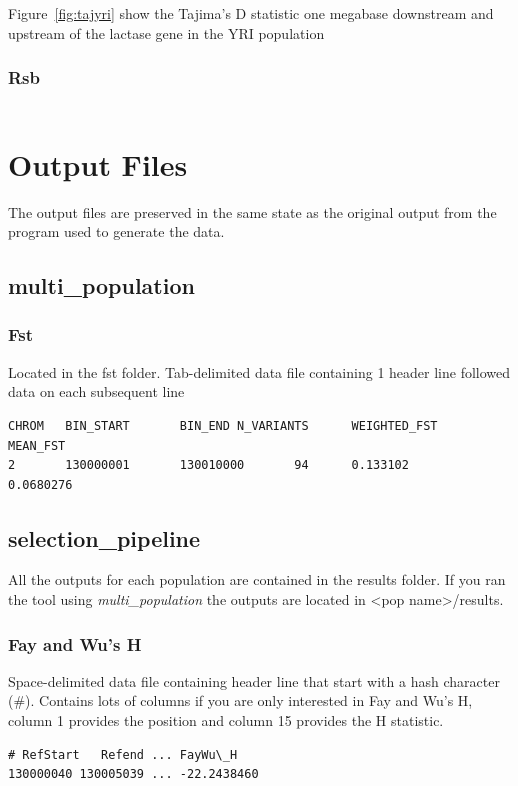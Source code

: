 Figure~\ref{fig:tajyri} show the Tajima's D statistic one megabase downstream and upstream of the lactase gene in the YRI population

\subsubsection{Rsb}
\begin{verbatim}
\end{verbatim}
\section{Output Files}
The output files are preserved in the same state as the original output from the program used to generate the data.
\subsection{multi\_population}
\subsubsection{Fst}
Located in the fst folder. Tab-delimited data file containing 1 header line followed data on each subsequent line\\
\begin{verbatim}
CHROM   BIN_START       BIN_END N_VARIANTS      WEIGHTED_FST    MEAN_FST  
2       130000001       130010000       94      0.133102        0.0680276 
\end{verbatim}
\subsection{selection\_pipeline}
All the outputs for each population are contained in the results folder. If you ran the tool using \emph{multi\_population} the outputs are located in <pop name>/results. 
\subsubsection{Fay and Wu's H}
Space-delimited data file containing header line that start with a hash character (\#). Contains lots of columns if you are only interested in Fay and Wu's H, column 1 provides the position and column 15 provides the H statistic. \\
\begin{verbatim}
# RefStart   Refend ... FayWu\_H
130000040 130005039 ... -22.2438460
\end{verbatim}
